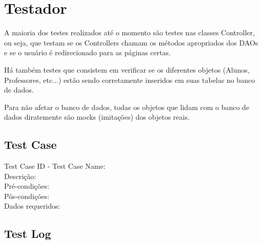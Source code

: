 \documentclass[12pt,letterpaper]{article}
\begin{document}




\pagebreak
\section{Testador}

A maioria dos testes realizados até o momento são testes nas classes Controller, ou seja, que testam se os Controllers chamam os métodos apropriados dos DAOs e se o usuário é redirecionado para as páginas certas. 

Há também testes que consistem em verificar se os diferentes objetos (Alunos, Professores, etc...) estão sendo corretamente inseridos em suas tabelas no banco de dados.

Para não afetar o banco de dados, todas os objetos que lidam com o banco de dados diratemente são mocks (imitações) dos objetos reais.

\subsection{Test Case}


\noindent Test Case ID - Test Case Name:\\
Descrição:\\ %
Pré-condições:\\ %
Pós-condições:\\ %
Dados requeridos:\\ %


\pagebreak
\subsection{Test Log}
\end{document}
